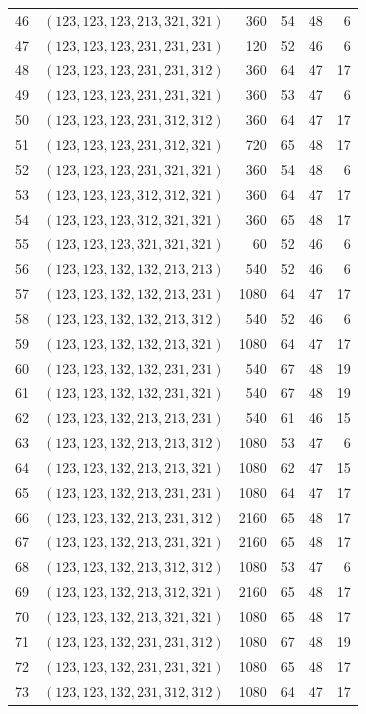 \documentclass[a4paper,11pt]{amsart}
\numberwithin{equation}{section}
\theoremstyle{definition}
\theoremstyle{remark}
\begin{document}
{\begin{longtable}{@{}rlrrrr@{}}
46 & $(123,123,123,213,321,321)$ & 360 & 54 & 48 & 6\\
47 & $(123,123,123,231,231,231)$ & 120 & 52 & 46 & 6\\
48 & $(123,123,123,231,231,312)$ & 360 & 64 & 47 & 17\\
49 & $(123,123,123,231,231,321)$ & 360 & 53 & 47 & 6\\
50 & $(123,123,123,231,312,312)$ & 360 & 64 & 47 & 17\\
51 & $(123,123,123,231,312,321)$ & 720 & 65 & 48 & 17\\
52 & $(123,123,123,231,321,321)$ & 360 & 54 & 48 & 6\\
53 & $(123,123,123,312,312,321)$ & 360 & 64 & 47 & 17\\
54 & $(123,123,123,312,321,321)$ & 360 & 65 & 48 & 17\\
55 & $(123,123,123,321,321,321)$ & 60 & 52 & 46 & 6\\
56 & $(123,123,132,132,213,213)$ & 540 & 52 & 46 & 6\\
57 & $(123,123,132,132,213,231)$ & 1080 & 64 & 47 & 17\\
58 & $(123,123,132,132,213,312)$ & 540 & 52 & 46 & 6\\
59 & $(123,123,132,132,213,321)$ & 1080 & 64 & 47 & 17\\
60 & $(123,123,132,132,231,231)$ & 540 & 67 & 48 & 19\\
61 & $(123,123,132,132,231,321)$ & 540 & 67 & 48 & 19\\
62 & $(123,123,132,213,213,231)$ & 540 & 61 & 46 & 15\\
63 & $(123,123,132,213,213,312)$ & 1080 & 53 & 47 & 6\\
64 & $(123,123,132,213,213,321)$ & 1080 & 62 & 47 & 15\\
65 & $(123,123,132,213,231,231)$ & 1080 & 64 & 47 & 17\\
66 & $(123,123,132,213,231,312)$ & 2160 & 65 & 48 & 17\\
67 & $(123,123,132,213,231,321)$ & 2160 & 65 & 48 & 17\\
68 & $(123,123,132,213,312,312)$ & 1080 & 53 & 47 & 6\\
69 & $(123,123,132,213,312,321)$ & 2160 & 65 & 48 & 17\\
70 & $(123,123,132,213,321,321)$ & 1080 & 65 & 48 & 17\\
71 & $(123,123,132,231,231,312)$ & 1080 & 67 & 48 & 19\\
72 & $(123,123,132,231,231,321)$ & 1080 & 65 & 48 & 17\\
73 & $(123,123,132,231,312,312)$ & 1080 & 64 & 47 & 17\\

\end{longtable}}
\end{document}
